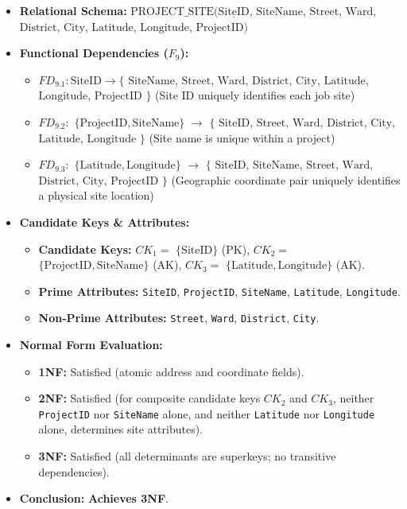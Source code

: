 \documentclass[a4paper,12pt]{report}
\begin{document}
\begin{itemize}
\item
  \textbf{Relational Schema:} \(\text{PROJECT\_SITE}(\underline{\text{SiteID}}\), \(\text{SiteName}\), \(\text{Street}\), \(\text{Ward}\), \(\text{District}\), \(\text{City}\), \(\text{Latitude}\), \(\text{Longitude}\), \(\text{ProjectID})\)
\item
  \textbf{Functional Dependencies (\(F_{9}\)):}

  \begin{itemize}
  \item
    \(FD_{9.1}: \text{SiteID} \rightarrow \{\) \(\text{SiteName}\), \(\text{Street}\), \(\text{Ward}\), \(\text{District}\), \(\text{City}\), \(\text{Latitude}\), \(\text{Longitude}\), \(\text{ProjectID}\) \(\}\) (Site ID uniquely identifies each job site)
  \item
    \(FD_{9.2}:\) \(\{\text{ProjectID}, \text{SiteName}\}\) \(\rightarrow\) \(\{\) \(\text{SiteID}\), \(\text{Street}\), \(\text{Ward}\), \(\text{District}\), \(\text{City}\), \(\text{Latitude}\), \(\text{Longitude}\) \(\}\) (Site name is unique within a project)
  \item
    \(FD_{9.3}:\) \(\{\text{Latitude}, \text{Longitude}\}\) \(\rightarrow\) \(\{\) \(\text{SiteID}\), \(\text{SiteName}\), \(\text{Street}\), \(\text{Ward}\), \(\text{District}\), \(\text{City}\), \(\text{ProjectID}\) \(\}\) (Geographic coordinate pair uniquely identifies a physical site location)
  \end{itemize}
\item
  \textbf{Candidate Keys \& Attributes:}

  \begin{itemize}
  \item
    \textbf{Candidate Keys:} \(CK_{1} =\) \(\{\text{SiteID}\}\) (PK), \(CK_{2} =\) \(\{\text{ProjectID}, \text{SiteName}\}\) (AK), \(CK_{3} =\) \(\{\text{Latitude}, \text{Longitude}\}\) (AK).
  \item
    \textbf{Prime Attributes:} \texttt{SiteID}, \texttt{ProjectID}, \texttt{SiteName}, \texttt{Latitude}, \texttt{Longitude}.
  \item
    \textbf{Non-Prime Attributes:} \texttt{Street}, \texttt{Ward}, \texttt{District}, \texttt{City}.
  \end{itemize}
\item
  \textbf{Normal Form Evaluation:}

  \begin{itemize}
  \item
    \textbf{1NF:} Satisfied (atomic address and coordinate fields).
  \item
    \textbf{2NF:} Satisfied (for composite candidate keys \(CK_{2}\) and \(CK_{3}\), neither \texttt{ProjectID} nor \texttt{SiteName} alone, and neither \texttt{Latitude} nor \texttt{Longitude} alone, determines site attributes).
  \item
    \textbf{3NF:} Satisfied (all determinants are superkeys; no transitive dependencies).
  \end{itemize}
\item
  \textbf{Conclusion:} \textbf{Achieves 3NF}.
\end{itemize}
\end{document}
